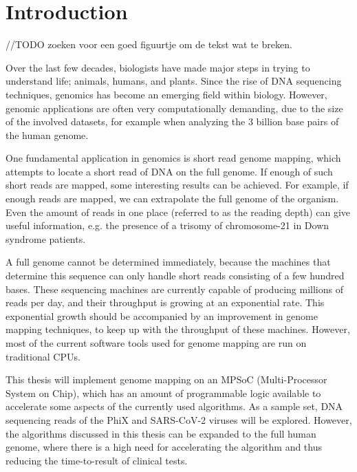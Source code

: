 
\chapter{Introduction}

//TODO zoeken voor een goed figuurtje om de tekst wat te breken.

Over the last few decades, biologists have made major steps in trying to understand life; animals, humans, and plants. Since the rise of DNA sequencing techniques, genomics has become an emerging field within biology. However, genomic applications are often very computationally demanding, due to the size of the involved datasets, for example when analyzing the 3 billion base pairs of the human genome.

One fundamental application in genomics is short read genome mapping, which attempts to locate a short read of DNA on the full genome. If enough of such short reads are mapped, some interesting results can be achieved. For example, if enough reads are mapped, we can extrapolate the full genome of the organism. Even the amount of reads in one place (referred to as the reading depth) can give useful information, e.g. the presence of a trisomy of chromosome-21 in Down syndrome patients.

A full genome cannot be determined immediately, because the machines that determine this sequence can only handle short reads consisting of a few hundred bases. These sequencing machines are currently capable of producing millions of reads per day, and their throughput is growing at an exponential rate. This exponential growth should be accompanied by an improvement in genome mapping techniques, to keep up with the throughput of these machines. However, most of the current software tools used for genome mapping are run on traditional CPUs. 

This thesis will implement genome mapping on an MPSoC (Multi-Processor System on Chip), which has an amount of programmable logic available to accelerate some aspects of the currently used algorithms. As a sample set, DNA sequencing reads of the PhiX and SARS-CoV-2 viruses will be explored. However, the algorithms discussed in this thesis can be expanded to the full human genome, where there is a high need for accelerating the algorithm and thus reducing the time-to-result of clinical tests.

